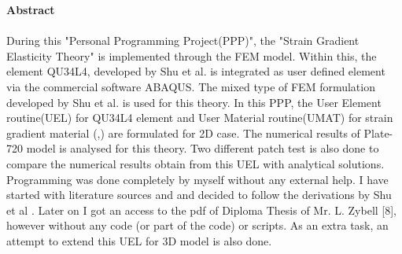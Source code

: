 \documentclass[12pt]{article}
\begin{document}
	\clearpage
    \textbf{\LARGE Abstract}\\
    \\
    { \large During this "Personal Programming Project(PPP)", the "Strain Gradient Elasticity Theory" is implemented through the FEM model. Within this, the element QU34L4, developed by Shu et al. is integrated as user defined element via the commercial software ABAQUS. The mixed type of FEM formulation developed by Shu et al. \cite{shu1999finite} is used for this theory.
    In this PPP, the User Element routine(UEL) for QU34L4 element and User Material routine(UMAT) for strain gradient material (\cite{amanatidou2002mixed},\cite{shu1999finite}) are formulated for 2D case. The numerical results of Plate-720 model is analysed for this theory. Two different patch test is also done to compare the numerical results obtain from this UEL with analytical solutions. Programming was done completely by myself without any external help. I have started with literature sources \cite{amanatidou2002mixed} and \cite{shu1999finite} and decided to follow the derivations by Shu et al \cite{shu1999finite}. Later on I got an access to the pdf of Diploma Thesis of Mr. L. Zybell [8], however without any code (or part of the code) or scripts. As an extra task, an attempt to extend this UEL for 3D model is also done.}





    \newpage
    	\listoffigures
    	\listoftables
    \clearpage
    \tableofcontents
    \clearpage
\end{document}
